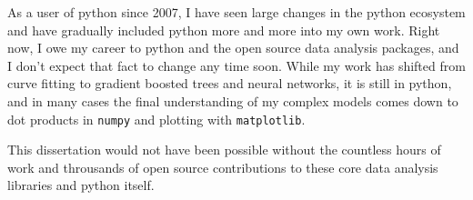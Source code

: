 As a user of python since 2007, I have seen large changes in the python
ecosystem and have gradually included python more and more into my own
work. Right now, I owe my career to python and the open source data
analysis packages, and I don't expect that fact to change any time soon.
While my work has shifted from curve fitting to gradient boosted trees
and neural networks, it is still in python, and in many cases the final
understanding of my complex models comes down to dot products in
\verb+numpy+ and plotting with \verb+matplotlib+.

This dissertation would not have been possible without the countless
hours of work and throusands of open source contributions to these core
data analysis libraries and python itself.
